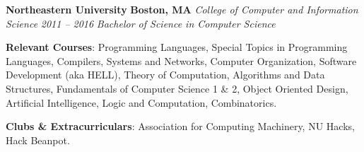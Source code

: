 \item
\headerrow
{\textbf{Northeastern University}}
{\textbf{Boston, MA}}
\headerrow
{\emph{College of Computer and Information Science}}
{\emph{2011 -- 2016}}
{\emph{Bachelor of Science in Computer Science}}
\begin{itemize*}
    \item \textbf{Relevant Courses}: Programming Languages, Special Topics in
    Programming Languages, Compilers, Systems and Networks, Computer
    Organization, Software Development (aka HELL), Theory of Computation,
    Algorithms and Data Structures, Fundamentals of Computer Science 1 \& 2,
    Object Oriented Design, Artificial Intelligence, Logic and Computation,
    Combinatorics.
    \item \textbf{Clubs \& Extracurriculars}: Association for Computing
    Machinery, NU Hacks, Hack Beanpot.
\end{itemize*}
